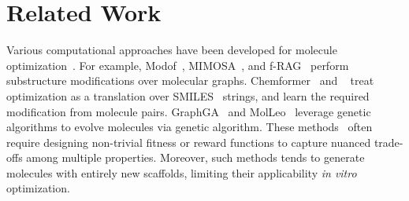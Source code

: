\section{Related Work}
\label{sec:rel}
%
Various computational approaches have been developed for molecule optimization~\cite{you2018graph, blaschke2020reinvent, xie2021mars, bung2022silico,sun2022molsearch}.
%
%
For example, Modof~\cite{chen2021deep}, MIMOSA~\cite{fu2021mimosa},
and f-RAG~\cite{lee2024molecule} 
perform substructure modifications over molecular graphs.
%
Chemformer~\cite{irwin2022chemformer} and \PMol~\cite{wu2024leveraging} treat optimization as a translation over SMILES~\cite{Weininger1988smiles} strings, 
and learn the required modification from molecule pairs.
%
GraphGA~\cite{jensen2019graph} and MolLeo~\cite{wang2024efficient} leverage 
genetic algorithms
to evolve molecules via genetic algorithm. %
%
These methods~\cite{kim2024genetic,yang2021hit} often require designing non-trivial fitness or reward functions
to capture nuanced trade-offs among multiple properties. 
%
%
Moreover, such methods 
tends to generate
molecules with entirely new scaffolds, 
limiting their applicability \emph{in vitro} optimization.


%
%
%
%
%

